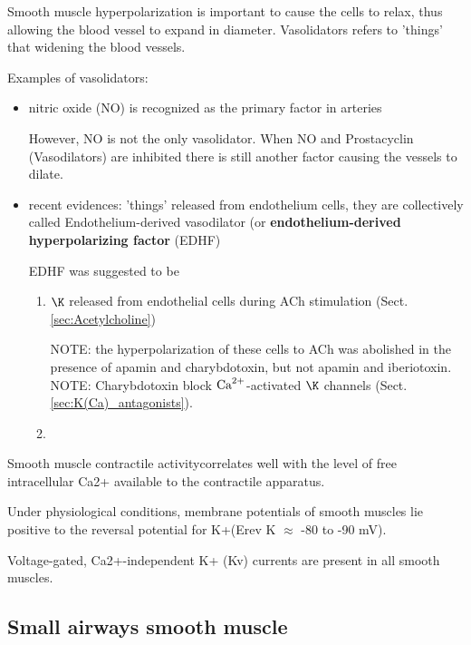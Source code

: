 Smooth muscle hyperpolarization is important to cause the cells to relax,  thus
allowing the blood vessel to expand in diameter. Vasolidators refers to 'things'
that widening the blood vessels.

Examples of vasolidators:
\begin{itemize}
  \item nitric oxide (NO) is recognized as the primary factor in arteries
  
  However, NO is not the only vasolidator.
  When NO and Prostacyclin (Vasodilators) are inhibited there is still another
  factor causing the vessels to dilate.
  
  \item recent evidences: 'things' released from endothelium cells, they are
  collectively called Endothelium-derived vasodilator (or {\bf
  endothelium-derived hyperpolarizing factor} (EDHF)
  

EDHF was suggested to be 
  \begin{enumerate}

    \item $\K$ released from endothelial cells during ACh stimulation
    (Sect.\ref{sec:Acetylcholine})

NOTE: the hyperpolarization of these cells to ACh was abolished in the presence
of apamin and charybdotoxin, but not apamin and iberiotoxin.
NOTE: Charybdotoxin block ${\text{Ca}^{2+}}$-activated $\K$ channels
(Sect.\ref{sec:K(Ca)_antagonists}).

    \item 
  \end{enumerate}
 
\end{itemize}


Smooth muscle contractile activitycorrelates well with the level of free
intracellular Ca2+ available to the contractile apparatus.

Under physiological conditions, membrane potentials of smooth muscles lie
positive to the reversal potential for K+(Erev K $\approx$ -80 to -90 mV).

Voltage-gated, Ca2+-independent K+ (Kv) currents are present in all smooth
muscles.




\subsection{Small airways smooth muscle}
\label{sec:smooth-muscle-small-airways}

